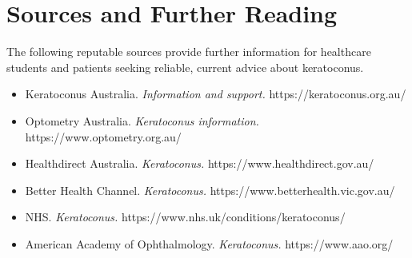 \section*{Sources and Further Reading}
The following reputable sources provide further information for healthcare students and patients seeking reliable, current advice about keratoconus.
\begin{itemize}
    \item Keratoconus Australia. \textit{Information and support.} https://keratoconus.org.au/
    \item Optometry Australia. \textit{Keratoconus information.} https://www.optometry.org.au/
    \item Healthdirect Australia. \textit{Keratoconus.} https://www.healthdirect.gov.au/
    \item Better Health Channel. \textit{Keratoconus.} https://www.betterhealth.vic.gov.au/
    \item NHS. \textit{Keratoconus.} https://www.nhs.uk/conditions/keratoconus/
    \item American Academy of Ophthalmology. \textit{Keratoconus.} https://www.aao.org/
\end{itemize}
